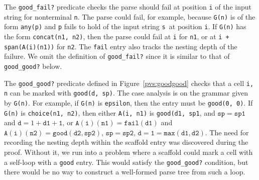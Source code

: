 \documentclass[sigplan,10pt,anonymous,review]{acmart}\settopmatter{printfolios=true,printccs=false,printacmref=false}
\begin{document}
\begin{CCSXML}
The \texttt{good\_fail?} predicate checks the parse should fail at
position \texttt{i} of the input string for nonterminal \texttt{n}\@.
The parse could fail, for example, because \texttt{G(n)} is of the
form \texttt{any(p)} and \texttt{p} fails to hold of the input string
\texttt{s }at position \texttt{i}\@.  If \texttt{G(n)} has the form
\texttt{concat(n1, n2)}, then the parse could fail at \texttt{i} for
\texttt{n1}, or at \texttt{i + span(A(i)(n1))} for \texttt{n2}\@.  The
\texttt{fail} entry also tracks the nesting depth of the failure.  We
omit the definition of \texttt{good\_fail?} since it is similar to
that of \texttt{good\_good?} below.
                      
%   

                      
                      
% 			




The \texttt{good\_good?} predicate defined in
Figure~\ref{pvs:goodgood} checks that a cell \texttt{i, n} can be
marked with \texttt{good(d, sp)}\@.  The case analysis is on the
grammar given by \texttt{G(n)}\@.  For example, if \texttt{G(n)} is
\texttt{epsilon}, then the entry must be \texttt{good(0, 0)}\@.  If
\texttt{G(n)} is \texttt{choice(n1, n2)}, then either \texttt{A(i,
  n1)} is \texttt{good(d1, sp1}, and $\mathtt{sp} = \mathtt{sp1}$ and
$\mathtt{d} = 1 + \mathtt{d1 + 1}$, or
$\mathtt{A(i)(n1)} = \mathtt{fail(d1)}$ and
$\mathtt{A(i)(n2)} = \mathtt{good(d2, sp2)}$,
$\mathtt{sp} = \mathtt{sp2}$,
$\mathtt{d} = \mathtt{1 = max(d1, d2)}$\@.
The need for recording the nesting depth within the scaffold entry was
discovered during the proof.  Without it, we run into a problem where
a scaffold could mark a cell with a self-loop with a \texttt{good} entry. 
This would satisfy the \texttt{good\_good?} condition, but there would be no
way to construct a well-formed parse tree from such a loop.  


\end{CCSXML}
\end{document}
